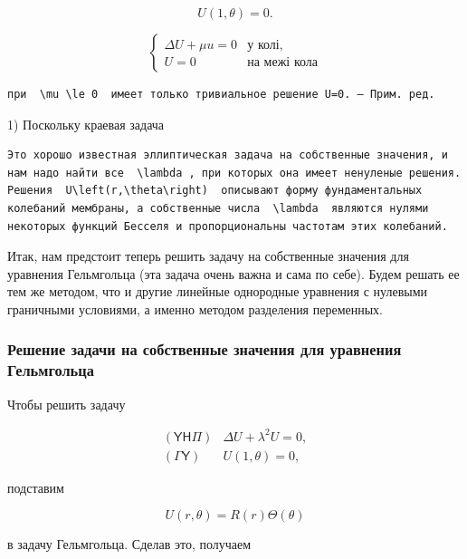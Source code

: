 \documentclass[
  ukrainian,
]{article}
\begin{document}
\[
U(1, \theta) = 0.
\]

\[
\begin{cases} \Delta U + \mu u = 0 & \text{у колі,} \\ U = 0 & \text{на межі кола} \end{cases}
\]

\begin{verbatim}
при  \mu \le 0  имеет только тривиальное решение U=0. — Прим. ред.
\end{verbatim}

1) Поскольку краевая задача

\begin{verbatim}
Это хорошо известная эллиптическая задача на собственные значения, и нам надо найти все  \lambda , при которых она имеет ненуленые решения. Решения  U\left(r,\theta\right)  описывают форму фундаментальных колебаний мембраны, а собственные числа  \lambda  являются нулями некоторых функций Бесселя и пропорциональны частотам этих колебаний.
\end{verbatim}

Итак, нам предстоит теперь решить задачу на собственные значения для
уравнения Гельмгольца (эта задача очень важна и сама по себе). Будем
решать ее тем же методом, что и другие линейные однородные уравнения с
нулевыми граничными условиями, а именно методом разделения переменных.

\subsubsection{Решение задачи на собственные значения для уравнения
Гельмгольца}\label{ux440ux435ux448ux435ux43dux438ux435-ux437ux430ux434ux430ux447ux438-ux43dux430-ux441ux43eux431ux441ux442ux432ux435ux43dux43dux44bux435-ux437ux43dux430ux447ux435ux43dux438ux44f-ux434ux43bux44f-ux443ux440ux430ux432ux43dux435ux43dux438ux44f-ux433ux435ux43bux44cux43cux433ux43eux43bux44cux446ux430}

Чтобы решить задачу

\[
\begin{array}{ll} (\mathsf{Y}\mathsf{H}\mathsf{\Pi}) & \Delta U + \lambda^2 U = 0, \\ (\mathsf{\Gamma}\mathsf{Y}) & U(1, \theta) = 0, \end{array}
\]

подставим

\[
U(r, \theta) = R(r) \Theta(\theta)
\]

в задачу Гельмгольца. Сделав это, получаем
\end{document}
